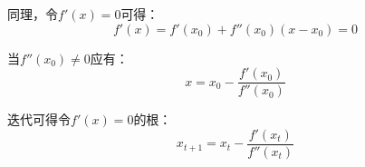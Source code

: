 \documentclass[11pt]{article}
\begin{document}
\begin{appendices}
同理，令$f'(x) = 0$可得：
\begin{equation*}
    f'(x) = f'(x_0) + f''(x_0)(x-x_0) = 0
\end{equation*}

当$f''(x_0) \neq 0$应有：
\begin{equation*}
    x = x_0 - \frac{f'(x_0)}{f''(x_0)}
\end{equation*}

迭代可得令$f'(x) = 0$的根：
\begin{equation*}
    x_{t+1} = x_t - \frac{f'(x_t)}{f''(x_t)}
\end{equation*}

\end{appendices}
\end{document}
